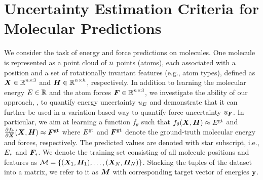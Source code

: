 \section{Uncertainty Estimation Criteria for Molecular Predictions}
\label{sec:approach}

We consider the task of energy and force predictions on molecules. One molecule is represented as a point cloud of $n$ points (atoms), each associated with a position and a set of rotationally invariant features (e.g., atom types), defined as $\bm{X} \in \operatorname{\mathbb{R}}^{n \times 3}$ and $\bm{H} \in \operatorname{\mathbb{R}}^{n \times h}$, respectively.
In addition to learning the molecular energy $E \in \operatorname{\mathbb{R}}$ and the atom forces $\bm{F} \in \operatorname{\mathbb{R}}^{n \times 3}$, we investigate the ability of our approach, \oursacro{},  to quantify energy uncertainty $u_{E}$ and demonstrate that it can further be used in a variation-based way to quantify force uncertainty $u_{\bm{F}}$. 
In particular, we aim at learning a function $f_\theta$ such that $f_\theta(\bm{X}, \bm{H})\approx E^{\operatorname{\text{gt}}}$ and $\frac{\partial f_\theta}{\partial \bm{X}}(\bm{X}, \bm{H}) \approx \bm{F}^{\operatorname{\text{gt}}}$ where  $E^{\operatorname{\text{gt}}}$ and $\bm{F}^{\operatorname{\text{gt}}}$ denote the ground-truth molecular energy and forces, respectively. The predicted values are denoted with star subscript, i.e., $E_*$ and $\bm{F}_*$. We denote the training set consisting of all molecule positions and features as $\mathcal{\bm{M}} = \{(\bm{X}_1, \bm{H}_1), \dots, (\bm{X}_N, \bm{H}_N)\}$.
Stacking the tuples of the dataset into a matrix, we refer to it as $\bm{M}$ with corresponding target vector of energies $\mathbf{y}$.

